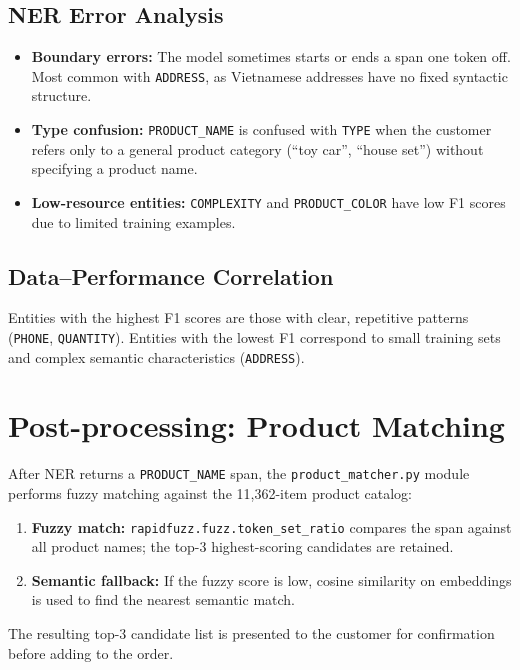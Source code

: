 \documentclass[12pt, a4paper]{report}
\begin{document}
\subsection{NER Error Analysis}

\begin{itemize}
  \item \textbf{Boundary errors:} The model sometimes starts or ends a span
        one token off. Most common with \texttt{ADDRESS},
        as Vietnamese addresses have no fixed syntactic structure.
  \item \textbf{Type confusion:} \texttt{PRODUCT\_NAME} is confused with \texttt{TYPE}
        when the customer refers only to a general product category
        (``toy car'', ``house set'') without specifying a product name.
  \item \textbf{Low-resource entities:} \texttt{COMPLEXITY} and
        \texttt{PRODUCT\_COLOR} have low F1 scores due to limited training examples.
\end{itemize}

\subsection{Data--Performance Correlation}

Entities with the highest F1 scores are those with clear, repetitive patterns
(\texttt{PHONE}, \texttt{QUANTITY}). Entities with the lowest F1 correspond to
small training sets and complex semantic characteristics (\texttt{ADDRESS}).

\section{Post-processing: Product Matching}

After NER returns a \texttt{PRODUCT\_NAME} span, the \texttt{product\_matcher.py} module
performs fuzzy matching against the 11,362-item product catalog:

\begin{enumerate}
  \item \textbf{Fuzzy match:} \texttt{rapidfuzz.fuzz.token\_set\_ratio}
        compares the span against all product names; the top-3 highest-scoring candidates are retained.
  \item \textbf{Semantic fallback:} If the fuzzy score is low,
        cosine similarity on embeddings is used to find the nearest semantic match.
\end{enumerate}

The resulting top-3 candidate list is presented to the customer for confirmation
before adding to the order.
\end{document}
